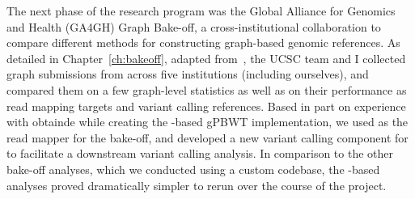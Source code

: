         
The next phase of the research program was the Global Alliance for Genomics and Health (GA4GH) Graph Bake-off, a cross-institutional collaboration to compare different methods for constructing graph-based genomic references. As detailed in Chapter~\ref{ch:bakeoff}, adapted from~\citet{novak2017genome}, the UCSC team and I collected graph submissions from across five institutions (including ourselves), and compared them on a few graph-level statistics as well as on their performance as read mapping targets and variant calling references. Based in part on experience with \vg obtainde while creating the \vg-based gPBWT implementation, we used \vg as the read mapper for the bake-off, and developed a new variant calling component for \vg to facilitate a downstream variant calling analysis. In comparison to the other bake-off analyses, which we conducted using a custom codebase, the \vg-based analyses proved dramatically simpler to rerun over the course of the project.

